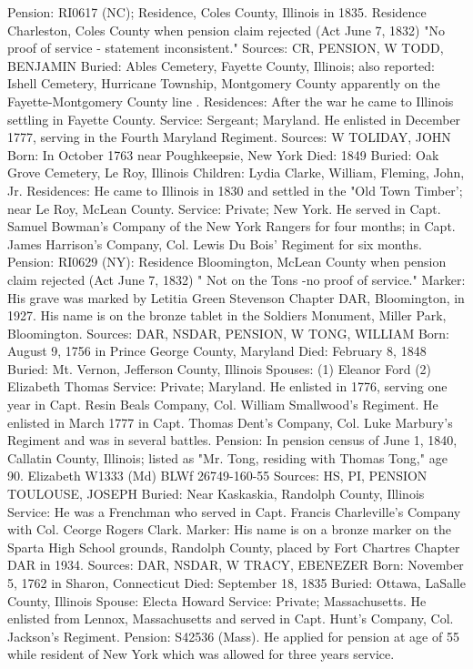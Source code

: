 Pension: RI0617 (NC); Residence, Coles County, Illinois in 1835. Residence Charleston, Coles County when pension claim rejected (Act June 7, 1832) "No proof of service - statement inconsistent." 
Sources: CR, PENSION, W 
TODD, BENJAMIN 
Buried: Ables Cemetery, Fayette County, Illinois; also reported: Ishell Cemetery, Hurricane Township, Montgomery County apparently on the Fayette-Mont­gomery County line . 
Residences: After the war he came to Illinois settling in Fayette County. 
Service: Sergeant; Maryland. He enlisted in December 1777, serving in the Fourth Maryland Regiment. 
Sources: W 
TOLIDAY, JOHN 
Born: In October 1763 near Poughkeepsie, New York 
Died: 1849 
Buried: Oak Grove Cemetery, Le Roy, Illinois 
Children: Lydia Clarke, William, Fleming, John, Jr. 
Residences: He came to Illinois in 1830 and settled in the "Old Town Timber'; near Le Roy, McLean County. 
Service: Private; New York. He served in Capt. Samuel Bowman's Company of the New York Rangers for four months; in Capt. James Harrison's Company, Col. Lewis Du Bois' Regiment for six months. 
Pension: RI0629 (NY): Residence Bloomington, McLean County when pension claim rejected (Act June 7, 1832) " Not on the Tons -no proof of service." 
Marker: His grave was marked by Letitia Green Stevenson Chapter DAR, Bloom­ington, in 1927. His name is on the bronze tablet in the Soldiers Monument, Miller Park, Bloomington. 
Sources: DAR, NSDAR, PENSION, W 
TONG, WILLIAM
Born: August 9, 1756 in Prince George County, Maryland 
Died: February 8, 1848 
Buried: Mt. Vernon, Jefferson County, Illinois 
Spouses: (1) Eleanor Ford 
	 (2) Elizabeth Thomas 
Service: Private; Maryland. He enlisted in 1776, serving one year in Capt. Resin Beals Company, Col. William Smallwood's Regiment. He enlisted in March 1777 in Capt. Thomas Dent's Company, Col. Luke Marbury's Regiment and was in several battles. 
Pension: In pension census of June 1, 1840, Callatin County, Illinois; listed as "Mr. Tong, residing with Thomas Tong," age 90. Elizabeth W1333 (Md) BLWf 26749-160-55 
Sources: HS, PI, PENSION 
TOULOUSE, JOSEPH
Buried: Near Kaskaskia, Randolph County, Illinois 
Service: He was a Frenchman who served in Capt. Francis Charleville's Com­pany with Col. Ceorge Rogers Clark.
Marker: His name is on a bronze marker on the Sparta High School grounds, Randolph County, placed by Fort Chartres Chapter DAR in 1934.
Sources: DAR, NSDAR, W 
TRACY, EBENEZER
Born: November 5, 1762 in Sharon, Connecticut
Died: September 18, 1835 
Buried: Ottawa, LaSalle County, Illinois 
Spouse: Electa Howard
Service: Private; Massachusetts. He enlisted from Lennox, Massachusetts and served in Capt. Hunt's Company, Col. Jackson's Regiment. Pension: S42536 (Mass). He applied for pension at age of 55 while resident of New York which was allowed for three years service.
